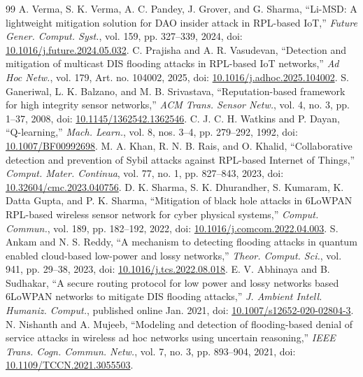 \begin{thebibliography}{99}
 A. Verma, S. K. Verma, A. C. Pandey, J. Grover, and G. Sharma, ``Li-MSD: A lightweight mitigation solution for DAO insider attack in RPL-based IoT,'' \emph{Future Gener. Comput. Syst.}, vol. 159, pp. 327--339, 2024, doi: \href{https://doi.org/10.1016/j.future.2024.05.032}{10.1016/j.future.2024.05.032}.
 C. Prajisha and A. R. Vasudevan, ``Detection and mitigation of multicast DIS flooding attacks in RPL-based IoT networks,'' \emph{Ad Hoc Netw.}, vol. 179, Art. no. 104002, 2025, doi: \href{https://doi.org/10.1016/j.adhoc.2025.104002}{10.1016/j.adhoc.2025.104002}.
 S. Ganeriwal, L. K. Balzano, and M. B. Srivastava, ``Reputation-based framework for high integrity sensor networks,'' \emph{ACM Trans. Sensor Netw.}, vol. 4, no. 3, pp. 1--37, 2008, doi: \href{https://doi.org/10.1145/1362542.1362546}{10.1145/1362542.1362546}.
 C. J. C. H. Watkins and P. Dayan, ``Q-learning,'' \emph{Mach. Learn.}, vol. 8, nos. 3--4, pp. 279--292, 1992, doi: \href{https://doi.org/10.1007/BF00992698}{10.1007/BF00992698}.
 M. A. Khan, R. N. B. Rais, and O. Khalid, ``Collaborative detection and prevention of Sybil attacks against RPL-based Internet of Things,'' \emph{Comput. Mater. Continua}, vol. 77, no. 1, pp. 827--843, 2023, doi: \href{https://doi.org/10.32604/cmc.2023.040756}{10.32604/cmc.2023.040756}.
 D. K. Sharma, S. K. Dhurandher, S. Kumaram, K. Datta Gupta, and P. K. Sharma, ``Mitigation of black hole attacks in 6LoWPAN RPL-based wireless sensor network for cyber physical systems,'' \emph{Comput. Commun.}, vol. 189, pp. 182--192, 2022, doi: \href{https://doi.org/10.1016/j.comcom.2022.04.003}{10.1016/j.comcom.2022.04.003}.
 S. Ankam and N. S. Reddy, ``A mechanism to detecting flooding attacks in quantum enabled cloud-based low-power and lossy networks,'' \emph{Theor. Comput. Sci.}, vol. 941, pp. 29--38, 2023, doi: \href{https://doi.org/10.1016/j.tcs.2022.08.018}{10.1016/j.tcs.2022.08.018}.
 E. V. Abhinaya and B. Sudhakar, ``A secure routing protocol for low power and lossy networks based 6LoWPAN networks to mitigate DIS flooding attacks,'' \emph{J. Ambient Intell. Humaniz. Comput.}, published online Jan. 2021, doi: \href{https://doi.org/10.1007/s12652-020-02804-3}{10.1007/s12652-020-02804-3}.
 N. Nishanth and A. Mujeeb, ``Modeling and detection of flooding-based denial of service attacks in wireless ad hoc networks using uncertain reasoning,'' \emph{IEEE Trans. Cogn. Commun. Netw.}, vol. 7, no. 3, pp. 893--904, 2021, doi: \href{https://doi.org/10.1109/TCCN.2021.3055503}{10.1109/TCCN.2021.3055503}.

\end{thebibliography}
